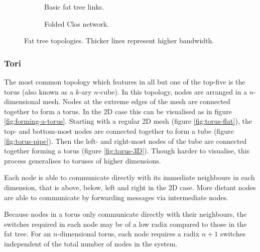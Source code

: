				\begin{figure}
					\begin{subfigure}[t]{\textwidth}
						\center
						
						\caption{Basic fat tree links.}
						\label{fig:fat-tree-concept}
					\end{subfigure}
					
					\vspace{1em}
					
					\begin{subfigure}[t]{\textwidth}
						\center
						
						\caption{Folded Clos network.}
						\label{fig:fat-tree-closs}
					\end{subfigure}
					
					\caption[Fat tree topologies.]{Fat tree topologies. Thicker lines
					represent higher bandwidth.}
					\label{fig:fat-tree}
				\end{figure}
			
			\subsubsection{Tori}
			
				The most common topology which features in all but one of the top-five
				is the torus (also known as a $k$-ary $n$-cube). In this topology, nodes
				are arranged in a $n$-dimensional mesh. Nodes at the extreme edges of
				the mesh are connected together to form a torus. In the 2D case this can
				be visualised as in figure \ref{fig:forming-a-torus}. Starting with a
				regular 2D mesh (figure \ref{fig:torus-flat}), the top- and bottom-most
				nodes are connected together to form a tube (figure
				\ref{fig:torus-pipe}).  Then the left- and right-most nodes of the tube
				are connected together forming a torus (figure \ref{fig:torus-3D}).
				Though harder to visualise, this process generalises to toruses of
				higher dimensions.
				
				Each node is able to communicate directly with its immediate neighbours
				in each dimension, that is above, below, left and right in the 2D case.
				More distant nodes are able to communicate by forwarding messages via
				intermediate nodes.
				
				Because nodes in a torus only communicate directly with their
				neighbours, the switches required in each node may be of a low radix
				compared to those in the fat tree. For an $n$-dimensional torus, each
				node requires a radix $n+1$ switches independent of the total number of
				nodes in the system.
				
